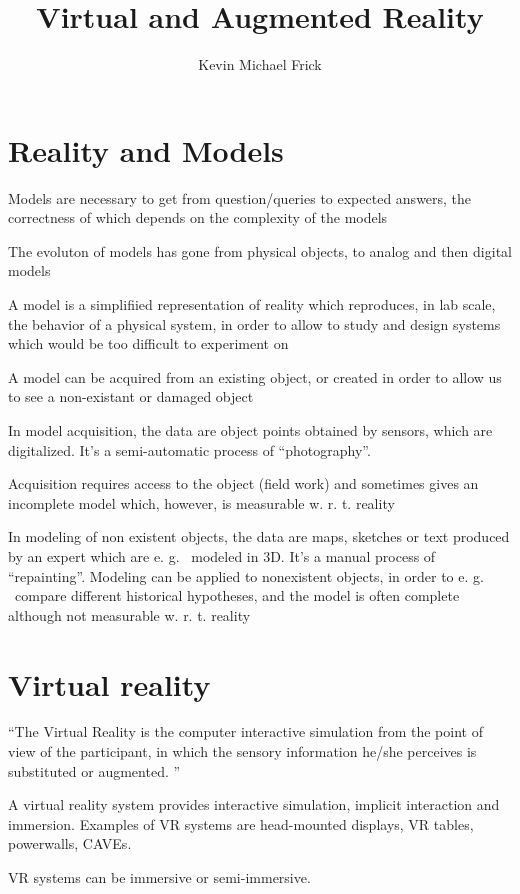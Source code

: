 \documentclass[a4paper]{article}
\title{Virtual and Augmented Reality}
\author{Kevin Michael Frick}
\begin{document}
\maketitle

\section{Reality and Models}

Models are necessary to get from question/queries to expected answers,
the correctness of which depends on the complexity of the models

The evoluton of models has gone from physical objects, to analog and
then digital models

A model is a simplifiied representation of reality which reproduces, in
lab scale, the behavior of a physical system, in order to allow to study
and design systems which would be too difficult to experiment on

A model can be acquired from an existing object, or created in order to
allow us to see a non-existant or damaged object

In model acquisition, the data are object points obtained by sensors,
which are digitalized.
It's a semi-automatic process of ``photography''.

Acquisition requires access to the object (field work) and sometimes
gives an incomplete model which, however, is measurable w.
r.
t.
reality

In modeling of non existent objects, the data are maps, sketches or text
produced by an expert which are e.
g.
~modeled in 3D.
It's a manual
process of ``repainting''.
Modeling can be applied to nonexistent
objects, in order to e.
g.
~compare different historical hypotheses, and
the model is often complete although not measurable w.
r.
t.
reality

\section{Virtual reality}

``The Virtual Reality is the computer interactive simulation from the
point of view of the participant, in which the sensory information
he/she perceives is substituted or augmented.
''

A virtual reality system provides interactive simulation, implicit
interaction and immersion.
Examples of VR systems are head-mounted
displays, VR tables, powerwalls, CAVEs.

VR systems can be immersive or semi-immersive.
\end{document}
